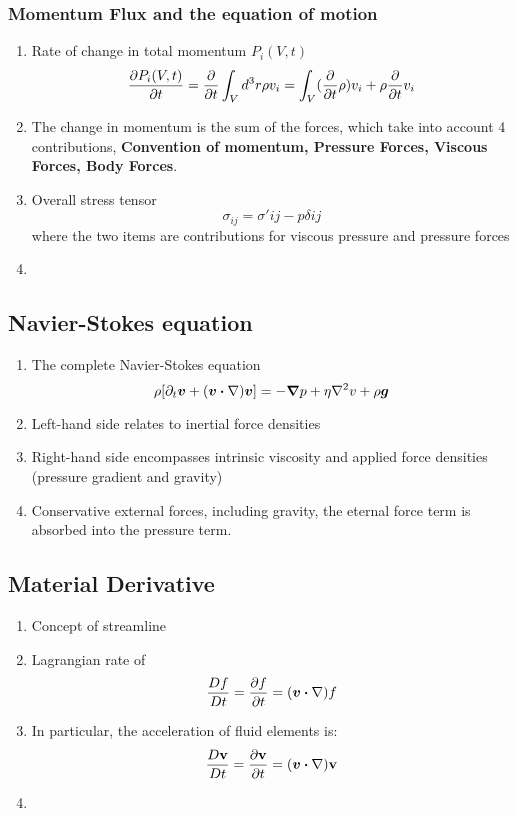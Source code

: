 \documentclass[12pt,a4paper]{article}
\begin{document}
        \subsubsection{Momentum Flux and the equation of motion}
            \begin{enumerate}
                \item Rate of change in total momentum $P_i(V,t)$
                $$
                    \pdv{P_i(V,t)}{t}=\pdv{t} \int_{V}d^3r\rho v_i=\int_{V}(\pdv{t}\rho) v_i+\rho\pdv{t}v_i
                $$
                \item The change in momentum is the sum of the forces, which take into account 4 contributions, \textbf{Convention of momentum, Pressure Forces, Viscous Forces, Body Forces}.
                \item Overall stress tensor 
                $$
                    \sigma_{ij}=\sigma' {ij} - p\delta{ij}
                $$
                where the two items are contributions for viscous pressure and pressure forces
                \item 
            \end{enumerate}
        \subsection{Navier-Stokes equation}
            \begin{enumerate}
                \item The complete Navier-Stokes equation
                $$
                    \rho [\partial_t\vb*{v} + (\vb*{v}\dotproduct \nabla)\vb*{v}]= - \grad{p} +\eta\laplacian{v}+\rho\vb*{g}
                $$
                \item Left-hand side relates to inertial force densities
                \item Right-hand side encompasses intrinsic viscosity and applied force densities (pressure gradient and gravity)
                \item Conservative external forces, including gravity, the eternal force term is absorbed into the pressure term.
            \end{enumerate}
        \subsection{Material Derivative}
            \begin{enumerate}
                \item Concept of streamline
                \item Lagrangian rate of 
                $$
                    \frac{Df}{Dt} = \pdv{f}{t} = (\vb*{v} \dotproduct \vb{\nabla})f
                $$
                \item In particular, the acceleration of fluid elements is:
                $$
                    \frac{D\vb{v}}{Dt} = \pdv{\vb{v}}{t} = (\vb*{v} \dotproduct \vb{\nabla})\vb{v}
                $$
                \item 
            \end{enumerate}
\end{document}
